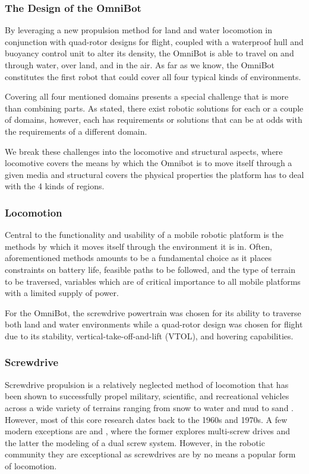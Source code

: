 \subsubsection{The Design of the OmniBot}
\label{sec:omnibot_design}

By leveraging a new propulsion method for land and water locomotion in conjunction with quad-rotor designs for flight, coupled with a waterproof hull and buoyancy control unit to alter its density, the OmniBot is able to travel on and through water, over land, and in the air. As far as we know, the OmniBot constitutes the first robot that could cover all four typical kinds of environments.

Covering all four mentioned domains presents a special challenge that is more than combining parts. As stated, there exist robotic solutions for each or a couple of domains, however, each has requirements or solutions that can be at odds with the requirements of a different domain. 

We break these challenges into the locomotive and structural aspects, where locomotive covers the means by which the Omnibot is to move itself through a given media and structural covers the physical properties the platform has to deal with the 4 kinds of regions. 
  
\subsubsection{Locomotion}

Central to the functionality and usability of a mobile robotic platform is the methods by which it moves itself through the environment it is in. Often, aforementioned methods amounts to be a fundamental choice as it places constraints on battery life, feasible paths to be followed, and the type of terrain to be traversed, variables which are of critical importance to all mobile platforms with a limited supply of power. 

For the OmniBot, the screwdrive powertrain was chosen for its ability to traverse both land and water environments while a quad-rotor design was chosen for flight due to its stability, vertical-take-off-and-lift (VTOL), and hovering capabilities.  

\subsubsection{Screwdrive}

Screwdrive propulsion is a relatively neglected method of locomotion that has been shown to successfully propel military, scientific, and recreational vehicles across a wide variety of terrains ranging from snow to water and mud to sand \cite{Fales1972, Cole1961c, Dugoff1967}. However, most of this core research dates back to the 1960s and 1970s. A few modern exceptions are \cite{Freeberg2010} and \cite{Osinski2014}, where the former explores multi-screw drives and  the latter the modeling of a dual screw system. However, in the robotic community they are exceptional as screwdrives are by no means a popular form of locomotion. 

